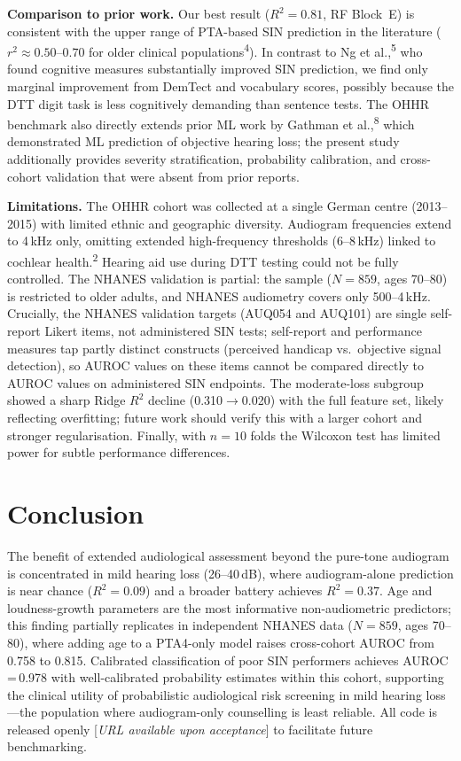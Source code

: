 \documentclass[12pt,a4paper]{article}
\begin{document}
\textbf{Comparison to prior work.}  Our best result ($R^2{=}0.81$, RF
Block~E) is consistent with the upper range of PTA-based SIN prediction in
the literature ($r^2{\approx}0.50$--$0.70$ for older clinical
populations\textsuperscript{4}).  In contrast to Ng et al.,\textsuperscript{5}
who found cognitive measures substantially improved SIN prediction, we find
only marginal improvement from DemTect and vocabulary scores, possibly because
the DTT digit task is less cognitively demanding than sentence tests.  The
OHHR benchmark also directly extends prior ML work by Gathman et al.,\textsuperscript{8}
which demonstrated ML prediction of objective hearing loss; the present study
additionally provides severity stratification, probability calibration, and
cross-cohort validation that were absent from prior reports.

\textbf{Limitations.}  The OHHR cohort was collected at a single German
centre (2013--2015) with limited ethnic and geographic diversity.  Audiogram
frequencies extend to 4\,kHz only, omitting extended high-frequency thresholds
(6--8\,kHz) linked to cochlear health.\textsuperscript{2}  Hearing aid use
during DTT testing could not be fully controlled.  The NHANES validation is
partial: the sample ($N{=}859$, ages 70--80) is restricted to older adults,
and NHANES audiometry covers only 500--4\,kHz.  Crucially, the NHANES
validation targets (AUQ054 and AUQ101) are single self-report Likert items,
not administered SIN tests; self-report and performance measures tap partly
distinct constructs (perceived handicap vs.\ objective signal detection), so
AUROC values on these items cannot be compared directly to AUROC values on
administered SIN endpoints.  The moderate-loss subgroup showed a sharp Ridge
$R^2$ decline (0.310$\to$0.020) with the full feature set, likely reflecting
overfitting; future work should verify this with a larger cohort and stronger
regularisation.  Finally, with $n{=}10$ folds the Wilcoxon test has limited
power for subtle performance differences.

\section{Conclusion}

The benefit of extended audiological assessment beyond the pure-tone audiogram
is concentrated in mild hearing loss (26--40\,dB), where audiogram-alone
prediction is near chance ($R^2{=}0.09$) and a broader battery achieves
$R^2{=}0.37$.  Age and loudness-growth parameters are the most informative
non-audiometric predictors; this finding partially replicates in independent
NHANES data ($N{=}859$, ages 70--80), where adding age to a PTA4-only model
raises cross-cohort AUROC from 0.758 to 0.815.  Calibrated classification of
poor SIN performers achieves AUROC\,=\,0.978 with well-calibrated probability
estimates within this cohort, supporting the clinical utility of probabilistic
audiological risk screening in mild hearing loss---the population where
audiogram-only counselling is least reliable.  All code is released openly
[\textit{URL available upon acceptance}] to facilitate future benchmarking.
\end{document}
